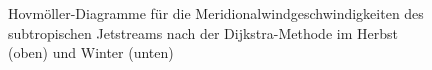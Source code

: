 \begin{figure}
  \centering
  \begin{minipage}{\textwidth}
  \end{minipage} \\ 
    \begin{minipage}{\textwidth}
  \end{minipage} \\ 
  \caption[Hovmöllerdiagramme des Meridionalwinds des Subtropenjets nach Dijkstra im Herbst und Winter]{Hovmöller-Diagramme für die Meridionalwindgeschwindigkeiten des subtropischen Jetstreams nach der Dijkstra-Methode im Herbst (oben) und Winter (unten)}
\end{figure}


